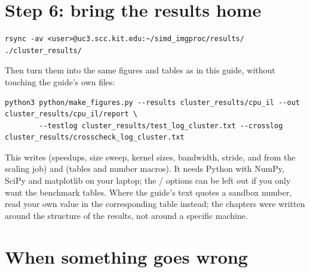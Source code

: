 \section{Step 6: bring the results home}

\begin{lstlisting}[style=shell]
rsync -av <user>@uc3.scc.kit.edu:~/simd_imgproc/results/ ./cluster_results/
\end{lstlisting}
Then turn them into the same figures and tables as in this guide, without touching the guide's own files:
\begin{lstlisting}[style=shell]
python3 python/make_figures.py --results cluster_results/cpu_il --out cluster_results/cpu_il/report \
        --testlog cluster_results/test_log_cluster.txt --crosslog cluster_results/crosscheck_log_cluster.txt
\end{lstlisting}
This writes  (speedups, size sweep, kernel sizes, bandwidth, stride, and  from the scaling job) and  (tables and number macros). It needs Python with NumPy, SciPy and matplotlib on your laptop; the / options can be left out if you only want the benchmark tables. Where the guide's text quotes a sandbox number, read your own value in the corresponding table instead; the chapters were written around the structure of the results, not around a specific machine.

\section{When something goes wrong}


